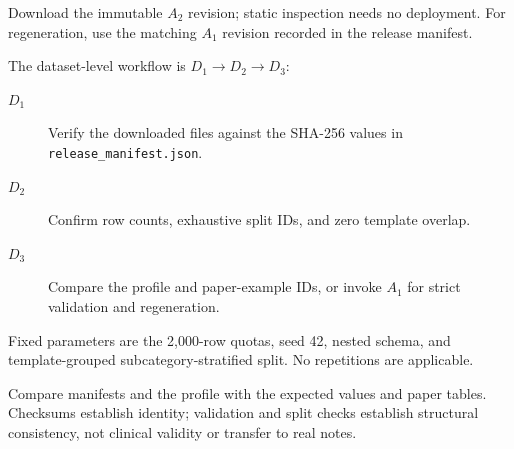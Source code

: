 \documentclass[conference]{IEEEtran}
\begin{document}

Download the immutable $A_2$ revision; static inspection needs no deployment.
For regeneration, use the matching $A_1$ revision recorded in the release
manifest.

\artcomp

The dataset-level workflow is $D_1\rightarrow D_2\rightarrow D_3$:

\begin{description}
\item[$D_1$] Verify the downloaded files against the SHA-256 values in
\texttt{release\_manifest.json}.
\item[$D_2$] Confirm row counts, exhaustive split IDs, and zero template
overlap.
\item[$D_3$] Compare the profile and paper-example IDs, or invoke $A_1$ for
strict validation and regeneration.
\end{description}

Fixed parameters are the 2,000-row quotas, seed 42, nested schema, and
template-grouped subcategory-stratified split.  No repetitions are applicable.

\artout

Compare manifests and the profile with the expected values and paper tables.
Checksums establish identity; validation and split checks establish structural
consistency, not clinical validity or transfer to real notes.
\end{document}
